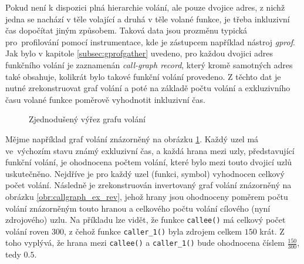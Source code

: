 \documentclass[czech,BP]{thesiskiv}
\begin{document}
Pokud není k dispozici plná hierarchie volání, ale pouze dvojice adres, z nichž jedna se nachází v těle volající a druhá v těle volané funkce, je třeba inkluzivní čas dopočítat jiným způsobem. Taková data jsou prozměnu typická pro~profilování pomocí instrumentace, kde je zástupcem například nástroj \emph{gprof}. Jak bylo v kapitole \ref{subsec:gprofgather} uvedeno, pro každou dvojici adres funkčního volání je zaznamenán \emph{call-graph record}, který kromě samotných adres také obsahuje, kolikrát bylo takové funkční volání provedeno. Z těchto dat je nutné zrekonstruovat graf volání a poté na základě počtu volání a exkluzivního času volané funkce poměrově vyhodnotit inkluzivní čas.

\begin{figure}[htp] 
\caption{Zjednodušený výřez grafu volání}\label{obr:callgraph_ex}
\end{figure}

Mějme například graf volání znázorněný na obrázku \ref{obr:callgraph_ex}. Každý uzel má ve~výchozím stavu známý exkluzivní čas, a každá hrana mezi uzly, představující funkční volání, je ohodnocena počtem volání, které bylo mezi touto dvojicí uzlů uskutečněno. Nejdříve je pro každý uzel (funkci, symbol) vyhodnocen celkový počet volání. Následně je zrekonstruován invertovaný graf volání znázorněný na obrázku \ref{obr:callgraph_ex_rev}, jehož hrany jsou ohodnoceny poměrem počtu volání znázorněným touto hranou a celkového počtu volání cílového (nyní zdrojového) uzlu. Na příkladu lze vidět, že funkce \texttt{callee()} má celkový počet volání roven $300$, z čehož funkce \texttt{caller\_1()} byla zdrojem celkem $150$ krát. Z toho vyplývá, že hrana mezi \texttt{callee()} a \texttt{caller\_1()} bude ohodnocena číslem $\frac{150}{300}$, tedy $0.5$.
\end{document}
